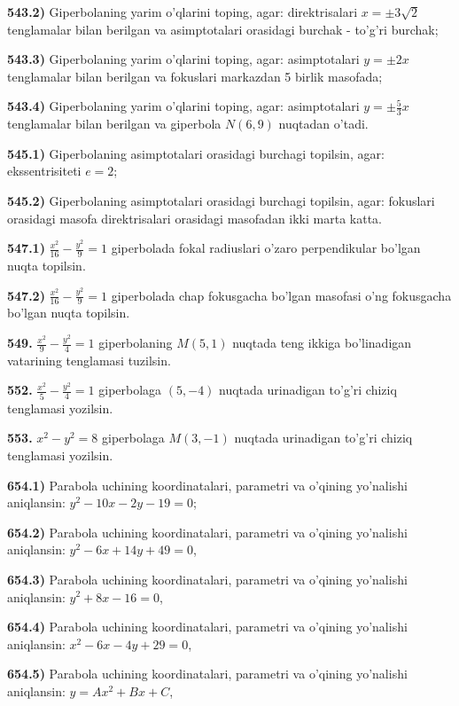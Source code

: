 \textbf{543.2)} Giperbolaning yarim o'qlarini toping, agar: direktrisalari $x = \pm 3\sqrt{2}$ tenglamalar bilan berilgan va asimptotalari orasidagi burchak - to'g'ri burchak;

\textbf{543.3)} Giperbolaning yarim o'qlarini toping, agar: asimptotalari $y = \pm 2x$ tenglamalar bilan berilgan va fokuslari markazdan 5 birlik masofada;

\textbf{543.4)} Giperbolaning yarim o'qlarini toping, agar: asimptotalari $y = \pm \frac{5}{3}x$ tenglamalar bilan berilgan va giperbola $N(6,9)$ nuqtadan o'tadi.

\textbf{545.1)} Giperbolaning asimptotalari orasidagi burchagi topilsin, agar: ekssentrisiteti $e = 2$;

\textbf{545.2)} Giperbolaning asimptotalari orasidagi burchagi topilsin, agar: fokuslari orasidagi masofa direktrisalari orasidagi masofadan ikki marta katta.

\textbf{547.1)} $\frac{x^{2}}{16} - \frac{y^{2}}{9} = 1$ giperbolada fokal radiuslari o'zaro perpendikular bo'lgan nuqta topilsin.

\textbf{547.2)} $\frac{x^{2}}{16} - \frac{y^{2}}{9} = 1$ giperbolada chap fokusgacha bo'lgan masofasi o'ng fokusgacha bo'lgan nuqta topilsin.

\textbf{549.} $\frac{x^{2}}{9} - \frac{y^{2}}{4} = 1$ giperbolaning $M(5,1)$ nuqtada teng ikkiga bo'linadigan vatarining tenglamasi tuzilsin.

\textbf{552.} $\frac{x^{2}}{5} - \frac{y^{2}}{4} = 1$ giperbolaga $(5, - 4)$ nuqtada urinadigan to'g'ri chiziq tenglamasi yozilsin.

\textbf{553.} $x^{2} - y^{2} = 8$ giperbolaga $M(3, - 1)$ nuqtada urinadigan to'g'ri chiziq tenglamasi yozilsin.

\textbf{654.1)} Parabola uchining koordinatalari, parametri va o'qining yo'nalishi aniqlansin: $y^{2} - 10x - 2y - 19 = 0$;

\textbf{654.2)} Parabola uchining koordinatalari, parametri va o'qining yo'nalishi aniqlansin: $y^{2} - 6x + 14y + 49 = 0$,

\textbf{654.3)} Parabola uchining koordinatalari, parametri va o'qining yo'nalishi aniqlansin: $y^{2} + 8x - 16 = 0$,

\textbf{654.4)} Parabola uchining koordinatalari, parametri va o'qining yo'nalishi aniqlansin: $x^{2} - 6x - 4y + 29 = 0$,

\textbf{654.5)} Parabola uchining koordinatalari, parametri va o'qining yo'nalishi aniqlansin: $y = Ax^{2} + Bx + C$,

